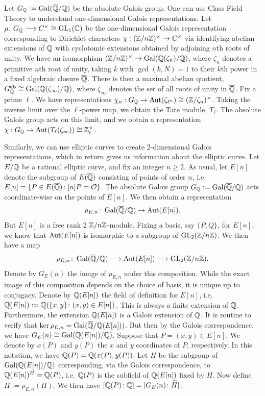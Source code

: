Let $G_{\mathbb{Q}}:= \operatorname{Gal}(\overline{\mathbb{Q}}/\mathbb{Q})$ be the absolute Galois group. One can use Class Field Theory to understand one-dimensional Galois representations. Let $\rho \colon G_{\mathbb{Q}} \stackrel{}{\longrightarrow} C^\times \cong \operatorname{GL}_1(\mathbb{C})$ be the one-dimensional Galois representation corresponding to Dirichlet characters $\chi: (\mathbb{Z}/n\mathbb{Z})^\times \to \mathbb{C}^\times$ via identifying abelian extensions of $\mathbb{Q}$ with cyclotomic extensions obtained by adjoining $n$th roots of unity. We have an isomorphism $(\mathbb{Z}/n\mathbb{Z})^\times \to \operatorname{Gal}(\mathbb{Q}(\zeta_n)/\mathbb{Q})$, where $\zeta_n$ denotes a primitive $n$th root of unity, taking $k$ with $\gcd(k,N)= 1$ to their $k$th power in a fixed algebraic closure $\overline{\mathbb{Q}}$. There is then a maximal abelian quotient, $G_{\mathbb{Q}}^{\operatorname{ab}} \cong \operatorname{Gal}(\mathbb{Q}(\zeta_\infty)/\mathbb{Q})$, where $\zeta_\infty$ denotes the set of all roots of unity in $\overline{\mathbb{Q}}$. Fix a prime $\ell$. We have representations $\chi_n: G_{\mathbb{Q}} \to \operatorname{Aut}(\zeta_{\ell^n}) \cong (\mathbb{Z}/\zeta_n)^\times$. Taking the inverse limit over the $\ell$-power map, we obtain the Tate module, $T_\ell$. The absolute Galois group acts on this limit, and we obtain a representation $\chi: G_{\mathbb{Q}} \to \operatorname{Aut}(T_\ell(\zeta_\infty)) \cong \mathbb{Z}_\ell^\times$.


Similarly, we can use elliptic curves to create 2-dimensional Galois representations, which in return gives us information about the elliptic curve. Let $E/\mathbb{Q}$ be a rational elliptic curve, and fix an integer $n \geq 2$. As usual, let $E[n]$ denote the subgroup of $E(\overline{\mathbb{Q}})$ consisting of points of order $n$, i.e. $E[n]= \{ P \in E(\overline{\mathbb{Q}}) \colon [n]P= \mathcal{O} \}$. The absolute Galois group $G_{\mathbb{Q}}:= \operatorname{Gal}(\overline{\mathbb{Q}}/\mathbb{Q})$ acts coordinate-wise on the points of $E[n]$. We then obtain a representation
	\[
	\rho_{E,n} \colon \operatorname{Gal}(\overline{\mathbb{Q}}/\mathbb{Q}) \to \operatorname{Aut}(E[n]).
	\]
But $E[n]$ is a free rank 2 $\mathbb{Z}/n\mathbb{Z}$-module. Fixing a basis, say $\{ P, Q \}$, for $E[n]$, we know that $\operatorname{Aut}(E[n])$ is isomorphic to a subgroup of $\operatorname{GL}_2(\mathbb{Z}/n\mathbb{Z})$. We then have a map
	\[
	\rho_{E,n} \colon \operatorname{Gal}(\overline{\mathbb{Q}}/\mathbb{Q}) \stackrel{}{\longrightarrow} \operatorname{Aut}(E[n]) \stackrel{}{\longrightarrow} \operatorname{GL}_2(\mathbb{Z}/n\mathbb{Z}).
	\]
Denote by $G_E(n)$ the image of $\rho_{E,n}$ under this composition. While the exact image of this composition depends on the choice of basis, it is unique up to conjugacy. Denote by $\mathbb{Q}(E[n])$ the field of definition for $E[n]$, i.e. $\mathbb{Q}(E[n]):= \mathbb{Q}( \{ x, y \} \colon (x,y) \in E[n] \}$. This is always a finite extension of $\mathbb{Q}$. Furthermore, the extension $\mathbb{Q}(E[n])$ is a Galois extension of $\mathbb{Q}$. It is routine to verify that $\ker \rho_{E,n}= \operatorname{Gal}(\overline{\mathbb{Q}}/\mathbb{Q}(E[n]))$. But then by the Galois correspondence, we have $G_E(n) \cong \operatorname{Gal}(\mathbb{Q}(E[n])/\mathbb{Q})$. Suppose that $P= (x,y) \in E[n]$. We denote by $x(P)$ and $y(P)$ the $x$ and $y$ coordinates of $P$, respectively. In this notation, we have $\mathbb{Q}(P)= \mathbb{Q}(x(P), y(P))$. Let $H$ be the subgroup of $\operatorname{Gal}(\mathbb{Q}(E[n])/\mathbb{Q})$ corresponding, via the Galois correspondence, to $\mathbb{Q}(E[n])^H= \mathbb{Q}(P)$, i.e. $\mathbb{Q}(P)$ is the subfield of $\mathbb{Q}(E[n])$ fixed by $H$. Now define $\widetilde{H}:= \rho_{E,n}(H)$. We then have $[\mathbb{Q}(P) \colon \mathbb{Q}]= |G_E(n) \colon \widetilde{H}|$. 


